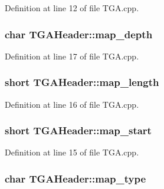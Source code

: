 Definition at line 12 of file T\+G\+A.\+cpp.

\hypertarget{struct_t_g_a_header_a12350dee94e8b261256ebc0e34dc3167}{
\subsubsection[{map\+\_\+depth}]{\setlength{\rightskip}{0pt plus 5cm}char T\+G\+A\+Header\+::map\+\_\+depth}}\label{struct_t_g_a_header_a12350dee94e8b261256ebc0e34dc3167}


Definition at line 17 of file T\+G\+A.\+cpp.

\hypertarget{struct_t_g_a_header_a9260b0a44a5a33b4abcbf6e0f8c3934c}{
\subsubsection[{map\+\_\+length}]{\setlength{\rightskip}{0pt plus 5cm}short T\+G\+A\+Header\+::map\+\_\+length}}\label{struct_t_g_a_header_a9260b0a44a5a33b4abcbf6e0f8c3934c}


Definition at line 16 of file T\+G\+A.\+cpp.

\hypertarget{struct_t_g_a_header_a4f186870a13d0825101121f0688f0fc6}{
\subsubsection[{map\+\_\+start}]{\setlength{\rightskip}{0pt plus 5cm}short T\+G\+A\+Header\+::map\+\_\+start}}\label{struct_t_g_a_header_a4f186870a13d0825101121f0688f0fc6}


Definition at line 15 of file T\+G\+A.\+cpp.

\hypertarget{struct_t_g_a_header_a1ab899cc4033d3c56c97f4c7666ceb47}{
\subsubsection[{map\+\_\+type}]{\setlength{\rightskip}{0pt plus 5cm}char T\+G\+A\+Header\+::map\+\_\+type}}\label{struct_t_g_a_header_a1ab899cc4033d3c56c97f4c7666ceb47}


